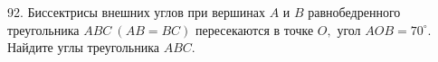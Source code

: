 92. Биссектрисы внешних углов при вершинах $A$ и $B$ равнобедренного треугольника $ABC\ (AB=BC)$ пересекаются в точке $O,$ угол $AOB=70^\circ.$ Найдите углы треугольника $ABC.$\\
